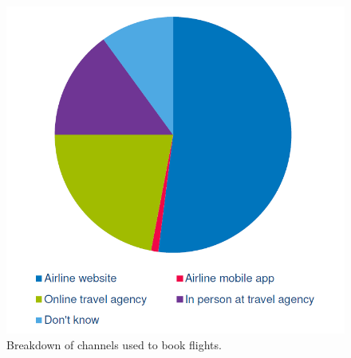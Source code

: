 \begin{figure}
\centering
\includegraphics{Grafik/channes_used_to_book}
\caption{Breakdown of channels used to book flights.}
\label{channes used to book}
\end{figure}


